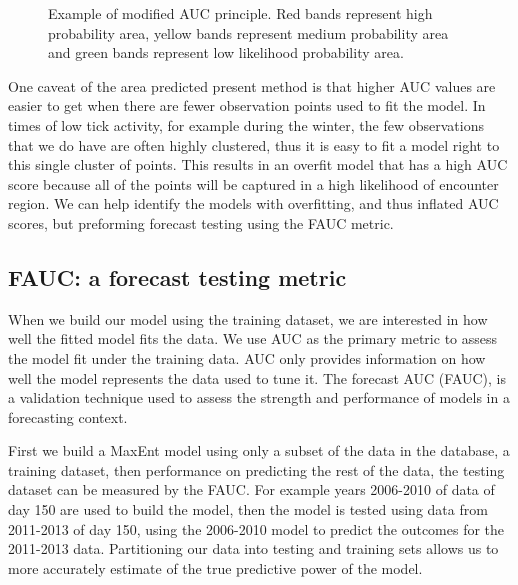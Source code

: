 \noindent 

\begin{figure} [!ht]
\centerline{}
\caption{Example of modified AUC principle. Red bands represent high probability area, yellow bands represent medium probability area and green bands represent low likelihood probability area.  }
\label{fig6}
\end{figure}

\noindent One caveat of the area predicted present method is that higher AUC values are easier to get when there are fewer observation points used to fit the model. In times of low tick activity, for example during the winter, the few observations that we do have are often highly clustered, thus it is easy to fit a model right to this single cluster of points. This results in an overfit model that has a high AUC score because all of the points will be captured in a high likelihood of encounter region. We can help identify the models with overfitting, and thus inflated AUC scores, but preforming forecast testing using the FAUC metric. 

\subsection{FAUC: a forecast testing metric}

When we build our model using the training dataset, we are interested in how well the fitted model fits the data. We use AUC as the primary metric to assess the model fit under the training data. AUC only provides information on how well the model represents the data used to tune it. The forecast AUC (FAUC), is a validation technique used to assess the strength and performance of models in a forecasting context. \newline

\noindent First we build a MaxEnt model using only a subset of the data in the database, a training dataset, then performance on predicting the rest of the data, the testing dataset can be measured by the FAUC. For example years 2006-2010 of data of day 150 are used to build the model, then the model is tested using data from 2011-2013 of day 150, using the 2006-2010 model to predict the outcomes for the 2011-2013 data. Partitioning our data into testing and training sets allows us to more accurately estimate of the true predictive power of the model. 

